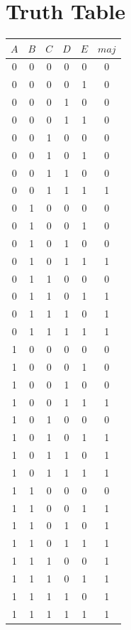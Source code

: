 \documentclass{article}
\begin{document}
\section*{Truth Table}
\begin{table}[H]
  \centering
  \begin{tabular}{ccccc|c}
    \toprule
    $A$ & $B$ & $C$ & $D$ & $E$ & $maj$ \\
    \midrule
    0   & 0   & 0   & 0   & 0   & 0     \\
    0   & 0   & 0   & 0   & 1   & 0     \\
    0   & 0   & 0   & 1   & 0   & 0     \\
    0   & 0   & 0   & 1   & 1   & 0     \\
    0   & 0   & 1   & 0   & 0   & 0     \\
    0   & 0   & 1   & 0   & 1   & 0     \\
    0   & 0   & 1   & 1   & 0   & 0     \\
    0   & 0   & 1   & 1   & 1   & 1     \\
    0   & 1   & 0   & 0   & 0   & 0     \\
    0   & 1   & 0   & 0   & 1   & 0     \\
    0   & 1   & 0   & 1   & 0   & 0     \\
    0   & 1   & 0   & 1   & 1   & 1     \\
    0   & 1   & 1   & 0   & 0   & 0     \\
    0   & 1   & 1   & 0   & 1   & 1     \\
    0   & 1   & 1   & 1   & 0   & 1     \\
    0   & 1   & 1   & 1   & 1   & 1     \\
    1   & 0   & 0   & 0   & 0   & 0     \\
    1   & 0   & 0   & 0   & 1   & 0     \\
    1   & 0   & 0   & 1   & 0   & 0     \\
    1   & 0   & 0   & 1   & 1   & 1     \\
    1   & 0   & 1   & 0   & 0   & 0     \\
    1   & 0   & 1   & 0   & 1   & 1     \\
    1   & 0   & 1   & 1   & 0   & 1     \\
    1   & 0   & 1   & 1   & 1   & 1     \\
    1   & 1   & 0   & 0   & 0   & 0     \\
    1   & 1   & 0   & 0   & 1   & 1     \\
    1   & 1   & 0   & 1   & 0   & 1     \\
    1   & 1   & 0   & 1   & 1   & 1     \\
    1   & 1   & 1   & 0   & 0   & 1     \\
    1   & 1   & 1   & 0   & 1   & 1     \\
    1   & 1   & 1   & 1   & 0   & 1     \\
    1   & 1   & 1   & 1   & 1   & 1     \\
    \bottomrule
  \end{tabular}
\end{table}
\newpage
\end{document}
